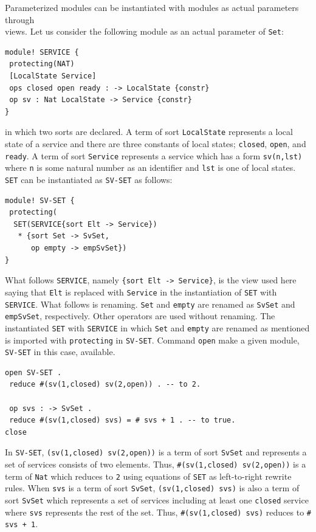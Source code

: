 \documentclass[12pt]{report}
\newcommand{\stt}[1]{{\small{\tt {#1}}}}
\begin{document}
Parameterized modules can be instantiated with modules as actual
parameters through\\ views. Let us consider the following module
as an actual parameter of {\tt Set}:
\begin{verbatim}
module! SERVICE {
 protecting(NAT)
 [LocalState Service]
 ops closed open ready : -> LocalState {constr}
 op sv : Nat LocalState -> Service {constr}
}
\end{verbatim}
in which two sorts are declared.  A term of sort {\tt LocalState}
represents a local state of a service and there are three constants of
local states; {\tt closed}, {\tt open}, and {\tt ready}.  A term of
sort {\tt Service} represents a service which has a form
\stt{sv(n,lst)} where {\tt n} is some natural number as an identifier
and {\tt lst} is one of local states.  {\tt SET} can be instantiated
as {\tt SV-SET} as follows:
\begin{verbatim}
module! SV-SET {
 protecting(
  SET(SERVICE{sort Elt -> Service})
   * {sort Set -> SvSet,
      op empty -> empSvSet})
}
\end{verbatim}
What follows {\tt SERVICE}, namely \stt{\{sort Elt -> Service\}}, is
the view used here saying that {\tt Elt} is replaced with
{\tt Service} in the instantiation of {\tt SET} with
{\tt SERVICE}. What follows {\tt *} is renaming. {\tt Set} and
{\tt empty} are renamed as {\tt SvSet} and {\tt empSvSet},
respectively. Other operators are used without renaming.
The instantiated {\tt SET} with {\tt SERVICE} in which {\tt Set} and
{\tt empty} are renamed as mentioned is imported with {\tt protecting}
in {\tt SV-SET}. Command {\tt open} make a given module, {\tt SV-SET}
in this case, available.
\begin{verbatim}
open SV-SET .
 reduce #(sv(1,closed) sv(2,open)) . -- to 2.

 op svs : -> SvSet .
 reduce #(sv(1,closed) svs) = # svs + 1 . -- to true.
close
\end{verbatim}
In {\tt SV-SET}, \stt{(sv(1,closed) sv(2,open))} is a term of sort
{\tt SvSet} and represents a set of services consists of two elements.
Thus, \stt{\#(sv(1,closed) sv(2,open))} is a term of {\tt Nat} which
reduces to {\tt 2} using equations of {\tt SET} as left-to-right
rewrite rules. When {\tt svs} is a term of sort {\tt SvSet},
\stt{(sv(1,closed) svs)} is also a term of sort {\tt SvSet} which
represents a set of services including at least one {\tt closed}
service where {\tt svs} represents the rest of the set. Thus,
\stt{\#(sv(1,closed) svs)} reduces to \stt{\# svs + 1}.
\end{document}
